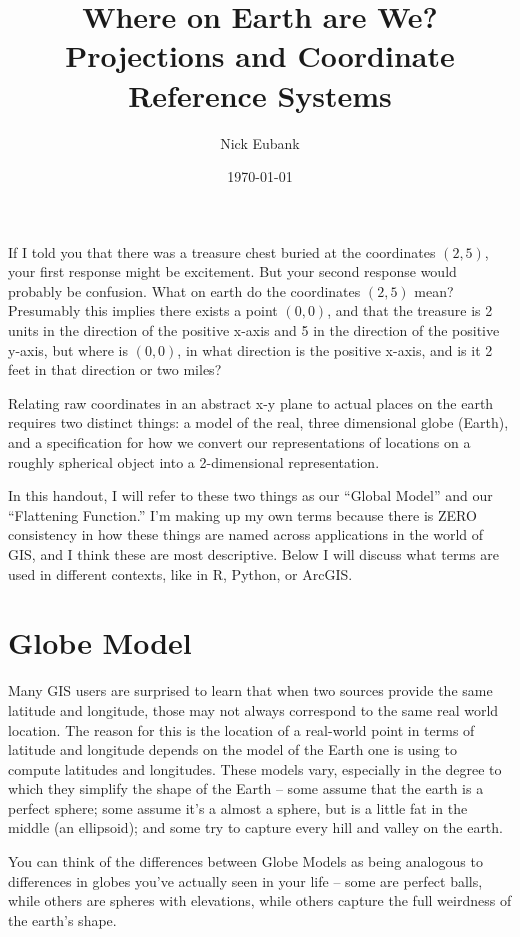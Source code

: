 \documentclass[11pt]{article}
\title{Where on Earth are We? \\ Projections and Coordinate Reference Systems}
\author{Nick Eubank}
\date{\today}
\begin{document}
\maketitle

If I told you that there was a treasure chest buried at the coordinates $(2, 5)$, your first response might be excitement. But your second response would probably be confusion. What on earth do the coordinates $(2, 5)$ mean? Presumably this implies there exists a point $(0, 0)$, and that the treasure is 2 units in the  direction of the positive x-axis and 5 in the direction of the positive y-axis, but where is $(0,0)$, in what direction is the positive x-axis, and is it 2 feet in that direction or two miles?

Relating raw coordinates in an abstract x-y plane to actual places on the earth requires two distinct things: a model of the real, three dimensional globe (Earth), and a specification for how we convert our representations of locations on a roughly spherical object into a 2-dimensional representation.

In this handout, I will refer to these two things as our ``Global Model'' and our ``Flattening Function.'' I'm making up my own terms because there is ZERO consistency in how these things are named across applications in the world of GIS, and I think these are most descriptive. Below I will discuss what terms are used in different contexts, like in R, Python, or ArcGIS.


\section{Globe Model}

Many GIS users are surprised to learn that when two sources provide the same latitude and longitude, those may not always correspond to the same real world location. The reason for this is the location of a real-world point in terms of latitude and longitude depends on the model of the Earth one is using to compute latitudes and longitudes. These models vary, especially in the degree to which they simplify the shape of the Earth -- some assume that the earth is a perfect sphere; some assume it's a almost a sphere, but is a little fat in the middle (an ellipsoid); and some try to capture every hill and valley on the earth.

You can think of the differences between Globe Models as being analogous to differences in globes you've actually seen in your life -- some are perfect balls, while others are spheres with elevations, while others capture the full weirdness of the earth's shape.
\end{document}
